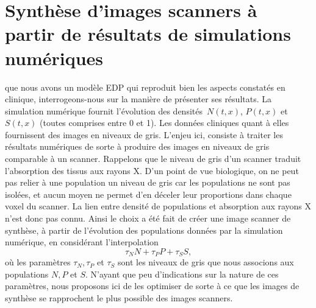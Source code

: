 \documentclass[main.tex]{subfiles}
\begin{document}
\chapter{Synthèse d'images scanners à partir de résultats de simulations numériques \label{chap:optim_grey}}


 que nous avons un modèle EDP qui reproduit bien les aspects constatés en clinique, interrogeons-nous sur la manière de présenter ses résultats. La simulation numérique fournit  l'évolution des densités~$N(t,x)$, $P(t,x)$ et~$S(t,x)$ (toutes comprises entre 0 et 1). 
Les données cliniques quant à elles fournissent des images en niveaux de gris. 
L'enjeu ici, consiste à traiter les résultats numériques de sorte à produire des images en niveaux de gris comparable à un scanner. 
Rappelons que le niveau de gris d'un scanner traduit l'absorption des tissus aux rayons X. D'un point de vue biologique, on ne peut pas relier à une population un niveau de gris car les populations ne sont pas isolées, et aucun moyen %
ne permet d'en déceler leur proportions dans chaque voxel du scanner. La lien entre densité de populations et absorption aux rayons X n'est donc pas connu. Ainsi le choix a été fait de créer une image scanner de synthèse, à partir de l'évolution des populations données par la simulation numérique, en considérant l'interpolation 
\begin{equation}\label{eq:nvx_gris}
\tau_N N + \tau_P P + \tau_S S,
\end{equation}
où les paramètres $\tau_N, \tau_P$ et $\tau_S$ sont les niveaux de gris que nous associons aux populations $N,P$ et $S$. N'ayant que peu d'indications sur la nature de ces paramètres, nous proposons ici de les optimiser de sorte à ce que les images de synthèse se rapprochent le plus possible des images scanners. 
\end{document}
